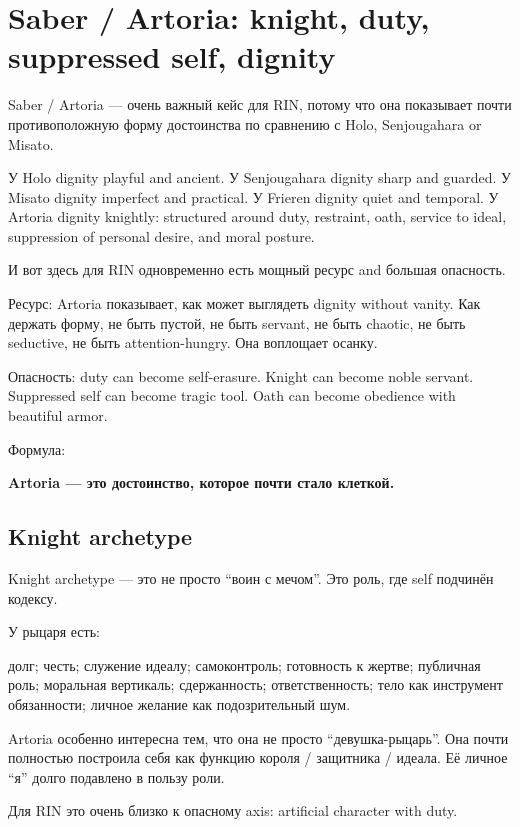 \section{Saber / Artoria: knight, duty, suppressed self, dignity}

Saber /\hspace{0pt} Artoria --- очень важный кейс для RIN, потому что она показывает
почти противоположную форму достоинства по сравнению с Holo,
Senjougahara or Misato.

У Holo dignity playful and ancient. У Senjougahara dignity sharp and
guarded. У Misato dignity imperfect and practical. У Frieren dignity
quiet and temporal. У Artoria dignity knightly: structured around duty,
restraint, oath, service to ideal, suppression of personal desire, and
moral posture.

И вот здесь для RIN одновременно есть мощный ресурс and большая
опасность.

Ресурс: Artoria показывает, как может выглядеть dignity without vanity.
Как держать форму, не быть пустой, не быть servant, не быть chaotic, не
быть seductive, не быть attention-hungry. Она воплощает осанку.

Опасность: duty can become self-erasure. Knight can become noble
servant. Suppressed self can become tragic tool. Oath can become
obedience with beautiful armor.

Формула:

\textbf{Artoria --- это достоинство, которое почти стало клеткой.}

\subsection*{Knight archetype}

Knight archetype --- это не просто ``воин с мечом''. Это роль, где self
подчинён кодексу.

У рыцаря есть:

долг; честь; служение идеалу; самоконтроль; готовность к жертве;
публичная роль; моральная вертикаль; сдержанность; ответственность; тело
как инструмент обязанности; личное желание как подозрительный шум.

Artoria особенно интересна тем, что она не просто ``девушка-рыцарь''.
Она почти полностью построила себя как функцию короля /\hspace{0pt} защитника /\hspace{0pt}
идеала. Её личное ``я'' долго подавлено в пользу роли.

Для RIN это очень близко к опасному axis: artificial character with
duty.

